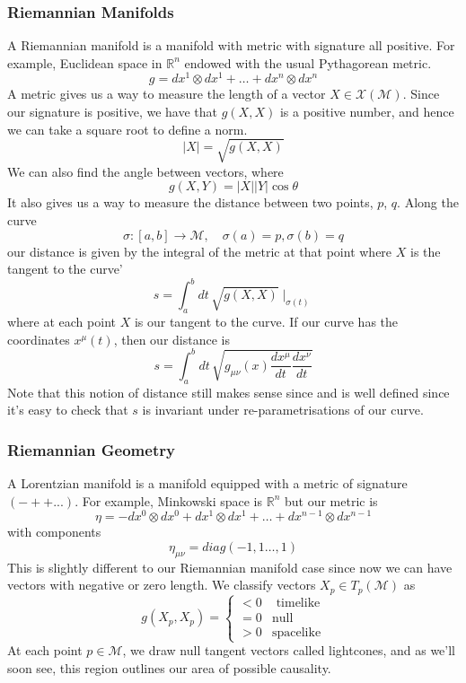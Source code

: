 \subsubsection{Riemannian Manifolds} 
A Riemannian manifold is a manifold with metric 
with signature all positive. 
For example, Euclidean space in $ \mathbb { R} ^ n $ endowed with 
the usual Pythagorean metric. 
\[
g = dx^ 1 \otimes dx ^ 1 + \dots + dx^ n \otimes dx^ n 
\]  A metric gives us a way to measure the
length of a vector $ X \in \mathcal{ X } ( \mathcal{ M } ) $. 
Since our signature is positive, we have that $ g ( X, X ) $ is a 
positive number, and hence we can take a square root to 
define a norm. 
\[
| X | = \sqrt{ g ( X, X ) } 
\] We can also find the angle between vectors, where
\[
g ( X, Y ) = | X| | Y | \cos \theta 
\] It also gives us a way to measure the distance between two points, 
$ p $, $ q $. Along the curve 
\[
\sigma : [ a, b ] \to \mathcal{ M }, \quad \sigma ( a) = p, \sigma ( b ) = q
\] our distance is given by the integral of the metric at 
that point where $ X $ is the tangent to the curve' 
\[
s = \int_ a ^ b dt \, \sqrt{ g ( X, X) } \mid_{ \sigma( t) }  
\] where at each point $ X $ is our tangent to the curve. 
If our curve has the coordinates $ x^ \mu ( t ) $, 
then our distance is 
\[
 s = \int_ a ^ b dt\, \sqrt{ g_{ \mu \nu } ( x) \frac{dx^ \mu }{ dt } \frac{ dx^ \nu }{ dt }} 
\]
Note that this notion of distance still makes sense since and 
is well defined since it's easy to check that 
$ s $ is invariant under re-parametrisations of our curve. 

\subsubsection{Riemannian Geometry} 
A Lorentzian manifold is a manifold equipped with 
a metric of signature $ ( - + + ... ) $. 
For example, Minkowski space is  $ \mathbb{ R} ^ n $
but our metric is 
\[
\eta = - dx^ 0 \otimes dx^ 0 + dx^ 1 \otimes dx^ 1 + \dots + dx^{ n-1 } \otimes dx^{ n- 1}
\] with components
\[
\eta_{ \mu \nu  } = diag ( - 1, 1 \dots, 1 )  
\]  This is slightly different to our Riemannian manifold 
case since now we can have vectors with negative or zero length. 
We classify vectors $ X_ p \in T_p ( \mathcal{ M } ) $
as 
\[
g ( X_p , X_p ) = \begin{cases}
 < 0 & \text{ timelike} \\
 = 0 & \text{null} \\
 > 0 & \text{spacelike}
\end{cases}
\] At each point $ p \in \mathcal{ M } $, we draw null tangent vectors called lightcones, 
and as we'll soon see, this region outlines our area of possible causality.

